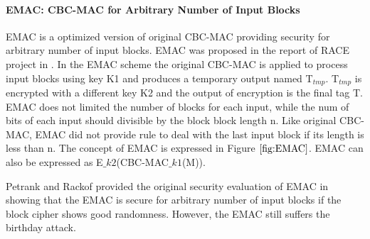 \documentclass{article}
\begin{document}
\paragraph{EMAC: CBC-MAC for Arbitrary Number of Input Blocks}
EMAC is a optimized version of original CBC-MAC providing security for arbitrary number of input blocks. EMAC was proposed in the report of RACE project in \cite{race}. In the EMAC scheme the original CBC-MAC is applied to process input blocks using key K1 and produces a temporary output named T$_{tmp}$. T$_{tmp}$ is encrypted with a different key K2 and the output of encryption is the final tag T. EMAC does not limited the number of blocks for each input, while the num of bits of each input should divisible by the block block length n. Like original CBC-MAC, EMAC did not provide rule to deal with the last input block if its length is less than n. The concept of EMAC is expressed in Figure $\ref{fig:EMAC}$. EMAC can also be expressed as E$\_{k2}$(CBC-MAC$\_{k1}$(M)). 

Petrank and Rackof provided the original security evaluation of EMAC in \cite{emac} showing that the EMAC is secure for arbitrary number of input blocks if the block cipher shows good randomness. However, the EMAC still suffers the birthday attack.

\end{document}
